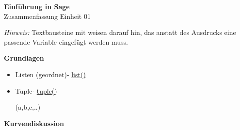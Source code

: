 \documentclass[a4paper,9pt,DIV15,twocolumn]{scrartcl}
\begin{document}
\begin{center}
    \textbf{\LARGE Einf\"uhrung in Sage}\\
    {\large Zusammenfassung Einheit 01}
\end{center}
\textsl{Hinweis:} Textbausteine mit  weisen darauf hin, das anstatt des Ausdrucks eine passende Variable eingefügt werden muss.

\medskip
\textbf{Grundlagen}
\begin{itemize}
    \item Listen (geordnet)- \href{http://docs.python.org/library/functions.html#list}{list()}
        \begin{sagein}
[a,b,c,..]
        \end{sagein}
    \item Tuple- \href{http://docs.python.org/library/functions.html#tuple}{tuple()}
        \begin{sagein}
(a,b,c,..)
        \end{sagein}
\end{itemize}  
\textbf{Kurvendiskussion}
\end{document}
